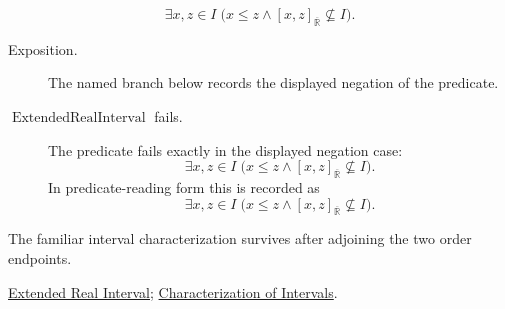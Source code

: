 \begin{remark*}
\[
  \exists x,z\in I\;\bigl(x\le z\land [x,z]_{\overline{\mathbb{R}}}\nsubseteq I\bigr).
\]
\end{remark*}

\begin{remark*}
\begin{description}
  \item[Exposition.] The named branch below records the displayed negation of the predicate.
  \item[\(\operatorname{ExtendedRealInterval}\) fails.] The predicate fails exactly in the displayed negation case:
  \[
  \exists x,z\in I\;\bigl(x\le z\land [x,z]_{\overline{\mathbb{R}}}\nsubseteq I\bigr).
  \]
  In predicate-reading form this is recorded as
  \[
    \exists x,z\in I\;\bigl(x\le z\land [x,z]_{\overline{\mathbb{R}}}\nsubseteq I\bigr).
  \]
\end{description}
\end{remark*}
\begin{remark*}[Interpretation]
The familiar interval characterization survives after adjoining the two
order endpoints.
\end{remark*}
\begin{dependencies}
\hyperref[def:extended-real-interval]{Extended Real Interval};
\hyperref[thm:interval-characterization]{Characterization of Intervals}.
\end{dependencies}
